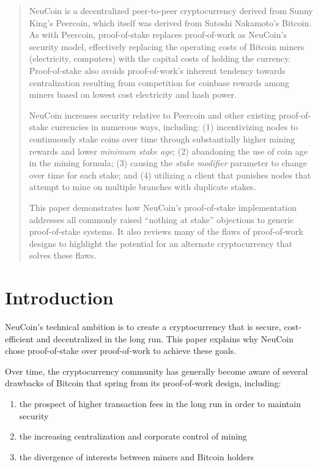 \documentclass[a4paper,11pt]{article}
\begin{document}
\begin{abstract}
NeuCoin is a decentralized peer-to-peer cryptocurrency derived from Sunny King's Peercoin, which itself was derived from Satoshi Nakamoto's Bitcoin. As with Peercoin, proof-of-stake replaces proof-of-work as NeuCoin's security model, effectively replacing the operating costs of Bitcoin miners (electricity, computers) with the capital costs of holding the currency. Proof-of-stake also avoids proof-of-work's inherent tendency towards centralization resulting from competition for coinbase rewards among miners based on lowest cost electricity and hash power. 

NeuCoin increases security relative to Peercoin and other existing proof-of-stake currencies in numerous ways, including: (1) incentivizing nodes to continuously stake coins over time through substantially higher mining rewards and lower \textit{minimum stake age}; (2) abandoning the use of coin age in the mining formula; (3) causing the \textit{stake modifier} parameter to change over time for each stake; and (4) utilizing a client that punishes nodes that attempt to mine on multiple branches with duplicate stakes.

This paper demonstrates how NeuCoin's proof-of-stake implementation addresses all commonly raised ``nothing at stake'' objections to generic proof-of-stake systems. It also reviews many of the flaws of proof-of-work designs to highlight the potential for an alternate cryptocurrency that solves these flaws.

\end{abstract}

\vspace{15mm}

\tableofcontents

\newpage

\section{Introduction}
NeuCoin's technical ambition is to create a cryptocurrency that is secure, cost-efficient and decentralized in the long run. This paper explains why NeuCoin chose proof-of-stake over proof-of-work to achieve these goals.
 

Over time, the cryptocurrency community has generally become aware of several drawbacks of Bitcoin that spring from its proof-of-work design, including:
\begin{enumerate}
\setlength{\itemsep}{0pt}
\item{the prospect of higher transaction fees in the long run in order to maintain security}
\item{the increasing centralization and corporate control of mining}
\item{the divergence of interests between miners and Bitcoin holders}
\end{enumerate}
\end{document}
